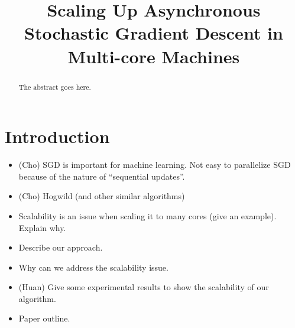\documentclass{sig-alternate-2013}
\newcommand{\0}{\boldsymbol{0}}
\begin{document}
\title{Scaling Up Asynchronous Stochastic Gradient Descent in Multi-core Machines}

 \author{}


\maketitle
\begin{abstract}
The abstract goes here.
\end{abstract}





%

\section{Introduction}
\label{sec:intro}

\begin{itemize}
  \item (Cho) SGD is important for machine learning. Not easy to parallelize SGD because of the nature of ``sequential updates''. 
  \item (Cho) Hogwild (and other similar algorithms)
  \item Scalability is an issue when scaling it to many cores (give an example). Explain why.  
  \item Describe our approach. 
  \item Why can we address the scalability issue. 
  \item (Huan) Give some experimental results to show the scalability of our algorithm. 
  \item Paper outline. 
  \end{itemize}
\end{document}
